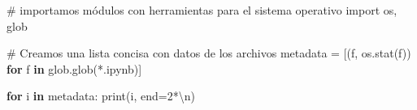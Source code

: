 \documentclass[
  spanish,
  letterpaper,
]{scrbook}
\newenvironment{Shaded}{\begin{snugshade}}{\end{snugshade}}
\newcommand{\BuiltInTok}[1]{\textcolor[rgb]{0.00,0.23,0.31}{#1}}
\newcommand{\CharTok}[1]{\textcolor[rgb]{0.13,0.47,0.30}{#1}}
\newcommand{\CommentTok}[1]{\textcolor[rgb]{0.37,0.37,0.37}{#1}}
\newcommand{\ControlFlowTok}[1]{\textcolor[rgb]{0.00,0.23,0.31}{\textbf{#1}}}
\newcommand{\DecValTok}[1]{\textcolor[rgb]{0.68,0.00,0.00}{#1}}
\newcommand{\ImportTok}[1]{\textcolor[rgb]{0.00,0.46,0.62}{#1}}
\newcommand{\KeywordTok}[1]{\textcolor[rgb]{0.00,0.23,0.31}{\textbf{#1}}}
\newcommand{\NormalTok}[1]{\textcolor[rgb]{0.00,0.23,0.31}{#1}}
\newcommand{\OperatorTok}[1]{\textcolor[rgb]{0.37,0.37,0.37}{#1}}
\newcommand{\StringTok}[1]{\textcolor[rgb]{0.13,0.47,0.30}{#1}}
\theoremstyle{definition}
\theoremstyle{remark}
\begin{document}
\begin{Shaded}
\begin{Highlighting}[]
\CommentTok{\# importamos módulos con herramientas para el sistema operativo}
\ImportTok{import}\NormalTok{ os, glob}

\CommentTok{\# Creamos una lista concisa con datos de los archivos}
\NormalTok{metadata }\OperatorTok{=}\NormalTok{ [(f, os.stat(f)) }\ControlFlowTok{for}\NormalTok{ f }\KeywordTok{in}\NormalTok{ glob.glob(}\StringTok{\textquotesingle{}*.ipynb\textquotesingle{}}\NormalTok{)]}

\ControlFlowTok{for}\NormalTok{ i }\KeywordTok{in}\NormalTok{ metadata:}
    \BuiltInTok{print}\NormalTok{(i, end}\OperatorTok{=}\DecValTok{2}\OperatorTok{*}\StringTok{\textquotesingle{}}\CharTok{\textbackslash{}n}\StringTok{\textquotesingle{}}\NormalTok{)}
\end{Highlighting}
\end{Shaded}
\end{document}
